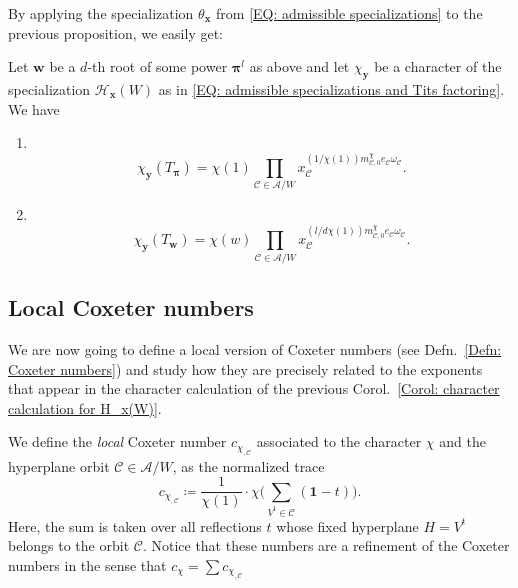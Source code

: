 \documentclass[ALCO, Unicode]{cedram}
\begin{document}
By applying the specialization $\theta_{\bm x}$ from \eqref{EQ: admissible specializations} to the previous proposition, we easily get: 

\begin{coro}\label{Corol: character calculation for H_x(W)}
Let $\bm w$ be a $d$-th root of some power $\bm \pi^l$ as above and let $\chi_{\bm y}$ be a character of the specialization $\mathcal{H}_{\bm x}(W)$ as in \eqref{EQ: admissible specializations and Tits factoring}. We have \begin{enumerate}
\item\ \vspace{-0.35cm} $$\chi_{\bm y}(T_{\bm \pi})=\chi(1)\prod_{\mathcal{C}\in\mathcal{A}/W}x_{\mathcal{C}}^{(1/\chi(1))m^{\chi}_{\mathcal{C},0}e_{\mathcal{C}}\omega_{\mathcal{C}}}.$$
\item\ \vspace{-0.35cm} $$\chi_{\bm y}(T_{\bm w})=\chi(w)\prod_{\mathcal{C}\in\mathcal{A}/W}x_{\mathcal{C}}^{(l/d\chi(1))m^{\chi}_{\mathcal{C},0}e_{\mathcal{C}}\omega_{\mathcal{C}}}.$$
\end{enumerate}
\end{coro}


\subsection{Local Coxeter numbers}

We are now going to define a local version of Coxeter numbers (see Defn.~\ref{Defn: Coxeter numbers}) and study how they are precisely related to the exponents that appear in the character calculation of the previous Corol.~\ref{Corol: character calculation for H_x(W)}.


\begin{defi}\label{Defn: Local Coxeter numbers} 
We define the \emph{local} Coxeter number $c_{\chi_{,\mathcal{C}}}$ associated to the character $\chi$ and the hyperplane orbit $\mathcal{C}\in\mathcal{A}/W$, as the normalized trace $$c_{\chi_{,\mathcal{C}}}\coloneqq \dfrac{1}{\chi(1)}\cdot\chi\Big( \sum_{V^{t}\in\mathcal{C}}(\bm 1-t)\Big).$$ Here, the sum is taken over all reflections $t$ whose fixed hyperplane $H=V^{t}$ belongs to the orbit $\mathcal{C}$. Notice that these numbers are a refinement of the Coxeter numbers in the sense that $c_{\chi}=\sum c_{\chi_{,\mathcal{C}}}$
\end{defi}
\end{document}
